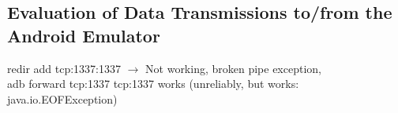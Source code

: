 \subsection{Evaluation of Data Transmissions to/from the Android Emulator}

redir add tcp:1337:1337 $\rightarrow$ Not working, broken pipe exception,\\
adb forward tcp:1337 tcp:1337 works (unreliably, but works:  java.io.EOFException)